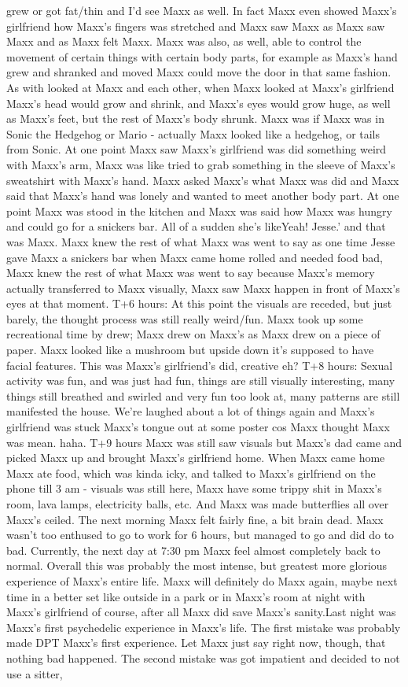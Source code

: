 \documentclass[12pt]{book}
\begin{document}
grew or got fat/thin and I'd see Maxx as well. In fact Maxx even showed Maxx's girlfriend how Maxx's fingers was stretched and Maxx saw Maxx as Maxx saw Maxx and as Maxx felt Maxx. Maxx was also, as well, able to control the movement of certain things with certain body parts, for example as Maxx's hand grew and shranked and moved Maxx could move the door in that same fashion. As with looked at Maxx and each other, when Maxx looked at Maxx's girlfriend Maxx's head would grow and shrink, and Maxx's eyes would grow huge, as well as Maxx's feet, but the rest of Maxx's body shrunk. Maxx was if Maxx was in Sonic the Hedgehog or Mario - actually Maxx looked like a hedgehog, or tails from Sonic. At one point Maxx saw Maxx's girlfriend was did something weird with Maxx's arm, Maxx was like tried to grab something in the sleeve of Maxx's sweatshirt with Maxx's hand. Maxx asked Maxx's what Maxx was did and Maxx said that Maxx's hand was lonely and wanted to meet another body part. At one point Maxx was stood in the kitchen and Maxx was said how Maxx was hungry and could go for a snickers bar. All of a sudden she's likeYeah! Jesse.' and that was Maxx. Maxx knew the rest of what Maxx was went to say as one time Jesse gave Maxx a snickers bar when Maxx came home rolled and needed food bad, Maxx knew the rest of what Maxx was went to say because Maxx's memory actually transferred to Maxx visually, Maxx saw Maxx happen in front of Maxx's eyes at that moment. T+6 hours: At this point the visuals are receded, but just barely, the thought process was still really weird/fun. Maxx took up some recreational time by drew; Maxx drew on Maxx's as Maxx drew on a piece of paper. Maxx looked like a mushroom but upside down it's supposed to have facial features. This was Maxx's girlfriend's did, creative eh? T+8 hours: Sexual activity was fun, and was just had fun, things are still visually interesting, many things still breathed and swirled and very fun too look at, many patterns are still manifested the house. We're laughed about a lot of things again and Maxx's girlfriend was stuck Maxx's tongue out at some poster cos Maxx thought Maxx was mean. haha. T+9 hours Maxx was still saw visuals but Maxx's dad came and picked Maxx up and brought Maxx's girlfriend home. When Maxx came home Maxx ate food, which was kinda icky, and talked to Maxx's girlfriend on the phone till 3 am - visuals was still here, Maxx have some trippy shit in Maxx's room, lava lamps, electricity balls, etc. And Maxx was made butterflies all over Maxx's ceiled. The next morning Maxx felt fairly fine, a bit brain dead. Maxx wasn't too enthused to go to work for 6 hours, but managed to go and did do to bad. Currently, the next day at 7:30 pm Maxx feel almost completely back to normal. Overall this was probably the most intense, but greatest more glorious experience of Maxx's entire life. Maxx will definitely do Maxx again, maybe next time in a better set like outside in a park or in Maxx's room at night with Maxx's girlfriend of course, after all Maxx did save Maxx's sanity.Last night was Maxx's first psychedelic experience in Maxx's life. The first mistake was probably made DPT Maxx's first experience. Let Maxx just say right now, though, that nothing bad happened. The second mistake was got impatient and decided to not use a sitter, 
\end{document}
